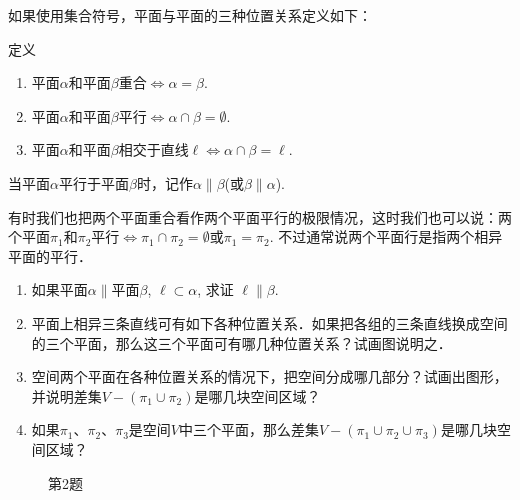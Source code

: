 如果使用集合符号，平面与平面的三种位置关系定义如下：

\begin{blk}{定义}
\begin{enumerate}
\item 平面$\alpha$和平面$\beta$重合$\Longleftrightarrow \alpha=\beta$.
\item 平面$\alpha$和平面$\beta$平行$\Longleftrightarrow \alpha\cap \beta=\emptyset$.
\item 平面$\alpha$和平面$\beta$相交于直线$\ell \Longleftrightarrow \alpha\cap \beta=\ell$.
\end{enumerate}
\end{blk}

当平面$\alpha$平行于平面$\beta$时，记作$\alpha\parallel \beta$(或$\beta\parallel \alpha$).

有时我们也把两个平面重合看作两个平面平行的极限情况，这时我们也可以说：两个平面$\pi_1$和$\pi_2$平行$\Longleftrightarrow \pi_1\cap \pi_2=\emptyset$或$\pi_1=\pi_2$. 不过通常说两个平面行是指两个相异平面的平行．

\begin{ex}
\begin{enumerate}
  \item 如果平面$\alpha\parallel$平面$\beta$, $\ell\subset \alpha$, 求证 $\ell\parallel \beta$.
  \item 平面上相异三条直线可有如下各种位置关系．如果把各组的三条直线换成空间的三个平面，那么这三个平面可有哪几种位置关系？试画图说明之．
  \item 空间两个平面在各种位置关系的情况下，把空间分成哪几部分？试画出图形，并说明差集$V-(\pi_1\cup \pi_2)$是哪几块空间区域？
  \item 如果$\pi_1$、$\pi_2$、$\pi_3$是空间$V$中三个平面，那么差集$V-(\pi_1\cup \pi_2\cup \pi_3)$是哪几块空间区域？
\end{enumerate}
\end{ex}

\begin{figure}[htp]
  \centering
{}
  \caption*{第2题}
\end{figure}

